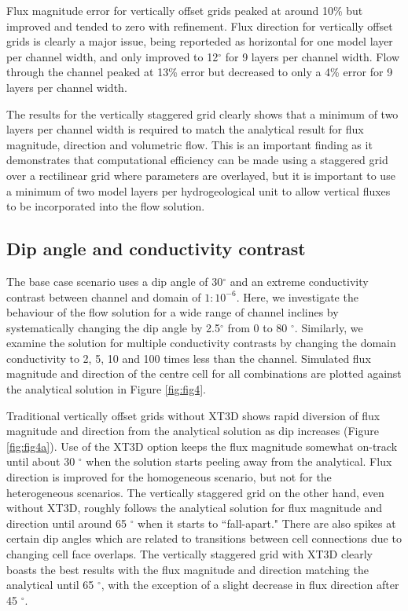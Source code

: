 \documentclass{article}
\begin{document}
Flux magnitude error for vertically offset grids peaked at around 10\% but improved and tended to zero with refinement. Flux direction for vertically offset grids is clearly a major issue, being reporteded as horizontal for one model layer per channel width, and only improved to 12$^{\circ}$ for 9 layers per channel width. Flow through the channel peaked at 13\% error but decreased to only a 4\% error for 9 layers per channel width.

The results for the vertically staggered grid clearly shows that a minimum of two layers per channel width is required to match the analytical result for flux magnitude, direction and volumetric flow. This is an important finding as it demonstrates that computational efficiency can be made using a staggered grid over a rectilinear grid where parameters are overlayed, but it is important to use a minimum of two model layers per hydrogeological unit to allow vertical fluxes to be incorporated into the flow solution. 

\subsection{Dip angle and conductivity contrast}

The base case scenario uses a dip angle of 30$^{\circ}$ and an extreme conductivity contrast between channel and domain of $1:10^{-6}$. Here, we investigate the behaviour of the flow solution for a wide range of channel inclines by systematically changing the dip angle by 2.5$^{\circ}$ from 0 to 80 $^{\circ}$. Similarly, we examine the solution for multiple conductivity contrasts by changing the domain conductivity to 2, 5, 10 and 100 times less than the channel. Simulated flux magnitude and direction of the centre cell for all combinations are plotted against the analytical solution in Figure \ref{fig:fig4}. 

Traditional vertically offset grids without XT3D shows rapid diversion of flux magnitude and direction from the analytical solution as dip increases (Figure \ref{fig:fig4a}). Use of the XT3D option keeps the flux magnitude somewhat on-track until about 30 $^{\circ}$ when the solution starts peeling away from the analytical. Flux direction is improved for the homogeneous scenario, but not for the heterogeneous scenarios. The vertically staggered grid on the other hand, even without XT3D, roughly follows the analytical solution for flux magnitude and direction until around 65 $^{\circ}$ when it starts to ``fall-apart." There are also spikes at certain dip angles which are related to transitions between cell connections due to changing cell face overlaps. The vertically staggered grid with XT3D clearly boasts the best results with the flux magnitude and direction matching the analytical until 65 $^{\circ}$, with the exception of a slight decrease in flux direction after 45 $^{\circ}$.
\end{document}
